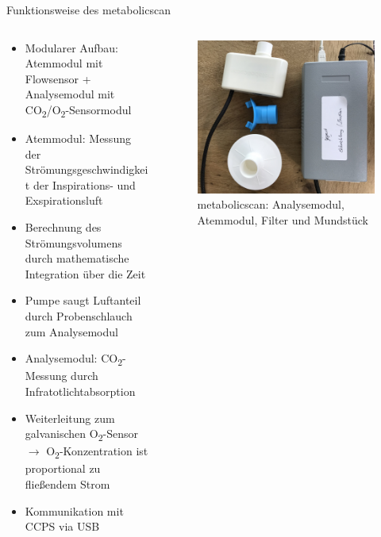 \documentclass[colorBG,slideColor,8pt]{beamer}
\begin{document}
\begin{frame}{Funktionsweise des metabolicscan}
\begin{columns}
\begin{column}{0.5\linewidth}
\begin{itemize}
	\item Modularer Aufbau: Atemmodul mit Flowsensor + Analysemodul mit CO\textsubscript{2}/O\textsubscript{2}-Sensormodul
	\item Atemmodul: Messung der Strömungsgeschwindigkeit der Inspirations- und Exspirationsluft
	\item Berechnung des Strömungsvolumens durch mathematische Integration über die Zeit
	\item Pumpe saugt Luftanteil durch Probenschlauch zum Analysemodul
	\item Analysemodul: CO\textsubscript{2}-Messung durch Infratotlichtabsorption
	\item Weiterleitung zum galvanischen O\textsubscript{2}-Sensor $\rightarrow$ O\textsubscript{2}-Konzentration ist proportional zu fließendem Strom
	\item Kommunikation mit CCPS via USB
\end{itemize}
\end{column}
\begin{column}{0.5\linewidth}
			\begin{figure}[H]
				\centering
				\includegraphics[width=0.8\linewidth]{Bilder/mbs.jpg}
				\caption{metabolicscan: Analysemodul, Atemmodul, Filter und Mundstück}
			\end{figure}
\end{column}
\end{columns}
\end{frame}
\end{document}
